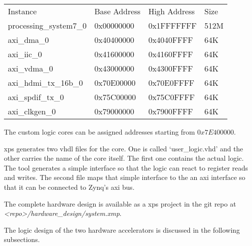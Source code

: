 \begin{tabular}{llll}
	Instance                & Base Address & High Address & Size\\
	processing\_system7\_0  & 0x00000000   & 0x1FFFFFFF   & 512M\\
	axi\_dma\_0             & 0x40400000   & 0x4040FFFF   & 64K\\
	axi\_iic\_0             & 0x41600000   & 0x4160FFFF   & 64K\\
	axi\_vdma\_0            & 0x43000000   & 0x4300FFFF   & 64K\\
	axi\_hdmi\_tx\_16b\_0   & 0x70E00000   & 0x70E0FFFF   & 64K\\
	axi\_spdif\_tx\_0       & 0x75C00000   & 0x75C0FFFF   & 64K\\
	axi\_clkgen\_0          & 0x79000000   & 0x7900FFFF   & 64K
\end{tabular}

The custom logic cores can be assigned addresses starting from $0x7E400000$.

\gls{xps} generates two \gls{vhdl} files for the core.
One is called `user\_logic.vhd' and the other carries the name of the core
itself.
The first one contains the actual logic.
The tool generates a simple interface so that the logic can react to register
reads and writes.
The second file maps that simple interface to the an \gls{axi} interface so that
it can be connected to Zynq's \gls{axi} bus.

The complete hardware design is available as a \gls{xps} project in the git repo
at \emph{<repo>/hardware\_design/system.xmp}.

The logic design of the two hardware accelerators is discussed in the following
subsections.

